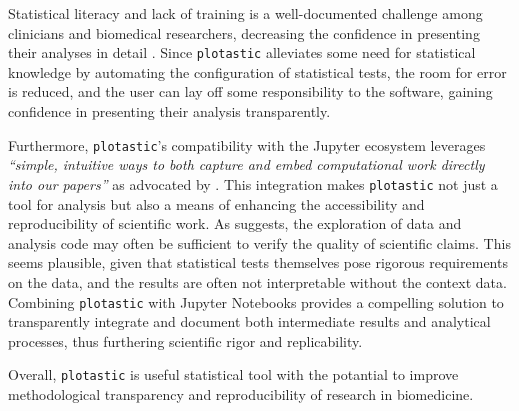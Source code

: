 Statistical literacy and lack of training is a well-documented challenge among
clinicians and biomedical researchers, decreasing the confidence in
presenting their analyses in detail
\cite{lakhlifiIllusionKnowledgeStatistics2023, federerDataLiteracyTraining2016}.
Since \texttt{plotastic} alleviates some need for statistical knowledge by
automating the configuration of statistical tests, the room for error is
reduced, and the user can lay off some responsibility to the software, gaining
confidence in presenting their analysis transparently. 

Furthermore, \texttt{plotastic}'s compatibility with the Jupyter ecosystem
leverages \textit{``simple, intuitive ways to both capture and embed computational work
directly into our papers''} as advocated by
\citet{mesirovAccessibleReproducibleResearch2010}. This integration makes
\texttt{plotastic} not just a tool for analysis but also a means of enhancing
the accessibility and reproducibility of scientific work. As
\citet{pengReproducibleResearchComputational2011} suggests, the exploration of
data and analysis code may often be sufficient to verify the quality of
scientific claims. This seems plausible, given that statistical tests themselves
pose rigorous requirements on the data, and the results are often not
interpretable without the context data. Combining \texttt{plotastic} with
Jupyter Notebooks provides a compelling solution to transparently integrate and
document both intermediate results and analytical processes, thus furthering
scientific rigor and replicability.

Overall, \texttt{plotastic} is useful statistical tool with the potantial to
improve methodological transparency and reproducibility of research in
biomedicine.





